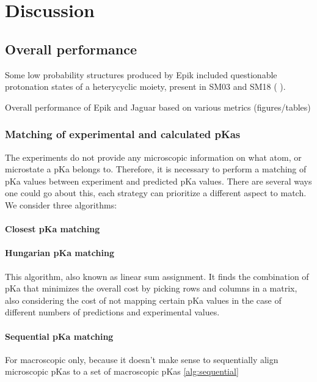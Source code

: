 \documentclass[9pt,lineno,final]{elife}
\begin{document}
\section{Discussion}



\subsection{Overall performance}

Some low probability structures produced by Epik included questionable protonation states of a heterycyclic moiety, present in SM03 and SM18 ( ). 



Overall performance of Epik and Jaguar based on various metrics (figures/tables)
\subsubsection {Matching of experimental and calculated pKas}


The experiments do not provide any microscopic information on what atom, or microstate a pKa belongs to.
%
Therefore, it is necessary to perform a matching of pKa values between experiment and predicted pKa values.
%
There are several ways one could go about this, each strategy can prioritize a different aspect to match.
%
We consider three algorithms:
\paragraph{Closest pKa matching}
%



%
\paragraph{Hungarian pKa matching}
This algorithm, also known as linear sum assignment.
%
It finds the combination of pKa that minimizes the overall cost by picking rows and columns in a matrix, also considering the cost of not mapping certain pKa values in the case of different numbers of predictions and experimental values.
%
\paragraph{Sequential pKa matching}

For macroscopic only, because it doesn't make sense to sequentially align microscopic pKas to a set of macroscopic pKas
\cref{alg:sequential}
\end{document}
